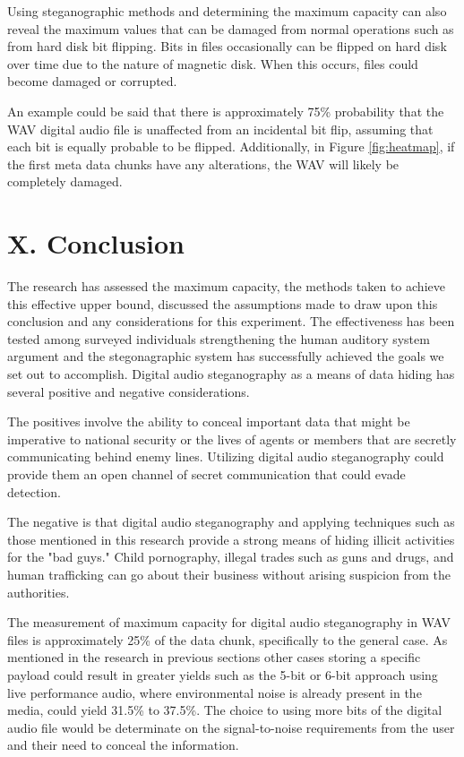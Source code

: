 \documentclass[letterpaper]{article}
\begin{document}
Using steganographic methods and determining the maximum capacity can also reveal the maximum values that can be damaged from normal operations such as from hard disk bit flipping. Bits in files occasionally can be flipped on hard disk over time due to the nature of magnetic disk. When this occurs, files could become damaged or corrupted.

An example could be said that there is approximately 75\% probability that the WAV digital audio file is unaffected from an incidental bit flip, assuming that each bit is equally probable to be flipped. Additionally, in Figure \ref{fig:heatmap}, if the first meta data chunks have any alterations, the WAV will likely be completely damaged.

\section{X. Conclusion}
The research has assessed the maximum capacity, the methods taken to achieve this effective upper bound, discussed the assumptions made to draw upon this conclusion and any considerations for this experiment. The effectiveness has been tested among surveyed individuals strengthening the human auditory system argument and the stegonagraphic system has successfully achieved the goals we set out to accomplish. Digital audio steganography as a means of data hiding has several positive and negative considerations. 

The positives involve the ability to conceal important data that might be imperative to national security or the lives of agents or members that are secretly communicating behind enemy lines. Utilizing digital audio steganography could provide them an open channel of secret communication that could evade detection. 

The negative is that digital audio steganography and applying techniques such as those mentioned in this research provide a strong means of hiding illicit activities for the "bad guys." Child pornography, illegal trades such as guns and drugs, and human trafficking can go about their business without arising suspicion from the authorities.

The measurement of maximum capacity for digital audio steganography in WAV files is approximately 25\% of the data chunk, specifically to the general case. As mentioned in the research in previous sections other cases storing a specific payload could result in greater yields such as the 5-bit or 6-bit approach using live performance audio, where environmental noise is already present in the media, could yield 31.5\% to 37.5\%. The choice to using more bits of the digital audio file would be determinate on the signal-to-noise requirements from the user and their need to conceal the information.
\end{document}
